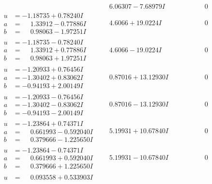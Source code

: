 \documentclass[1p]{elsarticle_modified}
\theoremstyle{definition}
\begin{document}
$$\begin{array}{c|c|c}
 & \phantom{-}6.06307 - 7.68979 I & \phantom{-0.000000 } 0 \\ \hline\begin{aligned}
u &= -1.18735 + 0.78240 I \\
a &= \phantom{-}1.33912 - 0.77886 I \\
b &= \phantom{-}0.98063 - 1.97251 I\end{aligned}
 & \phantom{-}4.6066 + 19.0224 I & \phantom{-0.000000 } 0 \\ \hline\begin{aligned}
u &= -1.18735 - 0.78240 I \\
a &= \phantom{-}1.33912 + 0.77886 I \\
b &= \phantom{-}0.98063 + 1.97251 I\end{aligned}
 & \phantom{-}4.6066 - 19.0224 I & \phantom{-0.000000 } 0 \\ \hline\begin{aligned}
u &= -1.20933 + 0.76456 I \\
a &= -1.30402 + 0.83062 I \\
b &= -0.94193 + 2.00149 I\end{aligned}
 & \phantom{-}0.87016 + 13.12930 I & \phantom{-0.000000 } 0 \\ \hline\begin{aligned}
u &= -1.20933 - 0.76456 I \\
a &= -1.30402 - 0.83062 I \\
b &= -0.94193 - 2.00149 I\end{aligned}
 & \phantom{-}0.87016 - 13.12930 I & \phantom{-0.000000 } 0 \\ \hline\begin{aligned}
u &= -1.23864 + 0.74371 I \\
a &= \phantom{-}0.661993 - 0.592040 I \\
b &= \phantom{-}0.379666 - 1.225650 I\end{aligned}
 & \phantom{-}5.19931 + 10.67840 I & \phantom{-0.000000 } 0 \\ \hline\begin{aligned}
u &= -1.23864 - 0.74371 I \\
a &= \phantom{-}0.661993 + 0.592040 I \\
b &= \phantom{-}0.379666 + 1.225650 I\end{aligned}
 & \phantom{-}5.19931 - 10.67840 I & \phantom{-0.000000 } 0 \\ \hline\begin{aligned}
u &= \phantom{-}0.093558 + 0.533903 I \\

\end{aligned}
\end{array}$$
\end{document}
